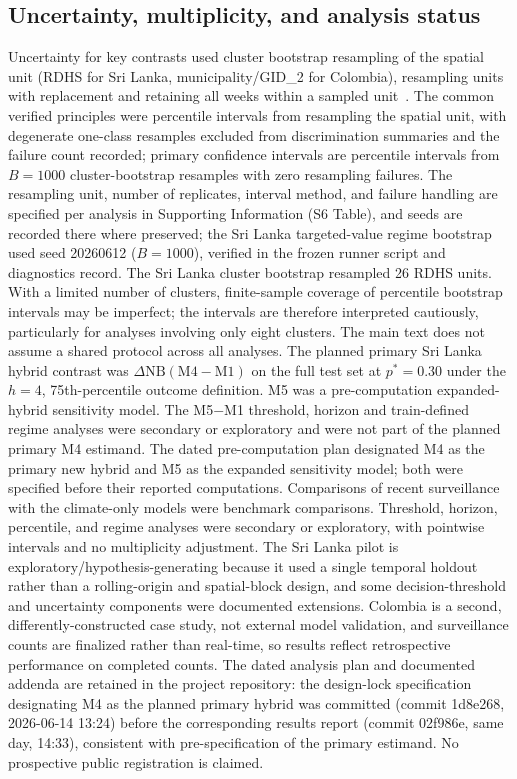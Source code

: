 \documentclass[11pt,a4paper]{article}
\begin{document}
\subsection{Uncertainty, multiplicity, and analysis status}
Uncertainty for key contrasts used cluster bootstrap resampling of the spatial unit (RDHS for Sri Lanka, municipality/GID\_2 for Colombia), resampling units with replacement and retaining all weeks within a sampled unit~\cite{CameronGelbachMiller2008}. The common verified principles were percentile intervals from resampling the spatial unit, with degenerate one-class resamples excluded from discrimination summaries and the failure count recorded; primary confidence intervals are percentile intervals from $B=1000$ cluster-bootstrap resamples with zero resampling failures. The resampling unit, number of replicates, interval method, and failure handling are specified per analysis in Supporting Information (S6 Table), and seeds are recorded there where preserved; the Sri Lanka targeted-value regime bootstrap used seed 20260612 ($B=1000$), verified in the frozen runner script and diagnostics record. The Sri Lanka cluster bootstrap resampled 26 RDHS units. With a limited number of clusters, finite-sample coverage of percentile bootstrap intervals may be imperfect; the intervals are therefore interpreted cautiously, particularly for analyses involving only eight clusters. The main text does not assume a shared protocol across all analyses. The planned primary Sri Lanka hybrid contrast was $\Delta\mathrm{NB}(\text{M4}-\text{M1})$ on the full test set at $p^*=0.30$ under the $h=4$, 75th-percentile outcome definition. M5 was a pre-computation expanded-hybrid sensitivity model. The M5$-$M1 threshold, horizon and train-defined regime analyses were secondary or exploratory and were not part of the planned primary M4 estimand. The dated pre-computation plan designated M4 as the primary new hybrid and M5 as the expanded sensitivity model; both were specified before their reported computations. Comparisons of recent surveillance with the climate-only models were benchmark comparisons. Threshold, horizon, percentile, and regime analyses were secondary or exploratory, with pointwise intervals and no multiplicity adjustment. The Sri Lanka pilot is exploratory/hypothesis-generating because it used a single temporal holdout rather than a rolling-origin and spatial-block design, and some decision-threshold and uncertainty components were documented extensions. Colombia is a second, differently-constructed case study, not external model validation, and surveillance counts are finalized rather than real-time, so results reflect retrospective performance on completed counts. The dated analysis plan and documented addenda are retained in the project repository: the design-lock specification designating M4 as the planned primary hybrid was committed (commit 1d8e268, 2026-06-14 13:24) before the corresponding results report (commit 02f986e, same day, 14:33), consistent with pre-specification of the primary estimand. No prospective public registration is claimed.
\end{document}
